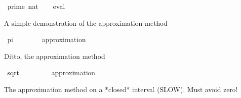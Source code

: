\begin{isabellebody}
\begin{isamarkuptext}
\end{isamarkuptext}\isamarkuptrue%
\isamarkupfalse%
\ {\isachardoublequoteopen}prime\ {\isacharparenleft}{\kern0pt}{}{}{}{}{}{}{}{}{}{\isacharcolon}{\kern0pt}{\isacharcolon}{\kern0pt}nat{\isacharparenright}{\kern0pt}{\isachardoublequoteclose}\isanewline
%
\isadelimproof
\ \ %
\endisadelimproof
%
\isatagproof
{}\isamarkupfalse%
\ eval%
\endisatagproof
{\isafoldproof}%
%
\isadelimproof
%
\endisadelimproof
%
\begin{isamarkuptext}%
A simple demonstration of the approximation method%
\end{isamarkuptext}\isamarkuptrue%
\isamarkupfalse%
\ {\isachardoublequoteopen}{\isasymbar}pi\ {\isacharminus}{\kern0pt}\ {}{}{}{\isacharslash}{\kern0pt}{}{}{}{\isasymbar}\ {\isacharless}{\kern0pt}\ {}{\isacharslash}{\kern0pt}{}{}{\isacharcircum}{\kern0pt}{}{\isachardoublequoteclose}\isanewline
%
\isadelimproof
\ \ %
\endisadelimproof
%
\isatagproof
{}\isamarkupfalse%
\ {\isacharparenleft}{\kern0pt}approximation\ {}{}{\isacharparenright}{\kern0pt}%
\endisatagproof
{\isafoldproof}%
%
\isadelimproof
%
\endisadelimproof
%
\begin{isamarkuptext}%
Ditto, the approximation method%
\end{isamarkuptext}\isamarkuptrue%
\isamarkupfalse%
\ {\isachardoublequoteopen}{\isasymbar}sqrt\ {}\ {\isacharminus}{\kern0pt}\ {}{\isachardot}{\kern0pt}{}{}{}{}{}{}{}{}{}{}{\isasymbar}\ {\isacharless}{\kern0pt}\ {}{\isacharslash}{\kern0pt}{}{}{\isacharcircum}{\kern0pt}{}{}{\isachardoublequoteclose}\isanewline
%
\isadelimproof
\ \ %
\endisadelimproof
%
\isatagproof
{}\isamarkupfalse%
\ {\isacharparenleft}{\kern0pt}approximation\ {}{}{\isacharparenright}{\kern0pt}%
\endisatagproof
{\isafoldproof}%
%
\isadelimproof
%
\endisadelimproof
%
\begin{isamarkuptext}%
The approximation method on a *closed* interval (SLOW). Must avoid zero!%
\end{isamarkuptext}\isamarkuptrue%

\end{isabellebody}
